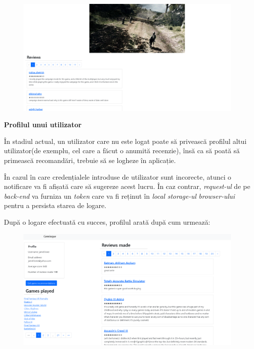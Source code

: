 \documentclass[12pt,a4paper]{report}
\begin{document}
\begin{figure}[H]
\centering
\caption{}
\begin{adjustbox}{max size={\textwidth}{\textheight}}
\includegraphics{exemplu_35_game_details_2}
\end{adjustbox}

\caption*{}
\end{figure}

\bigskip
\textbf{Profilul unui utilizator}
\bigskip

În stadiul actual, un utilizator care nu este logat poate să privească profilul altui utilizator(de exemplu, cel care a făcut o anumită recenzie), însă ca să poată să primească recomandări, trebuie să se logheze în aplicație.

În cazul în care credențialele introduse de utilizator sunt incorecte, atunci o notificare va fi afișată care să sugereze acest lucru. În caz contrar, \emph{request-ul} de pe \emph{back-end} va furniza un \emph{token} care va fi reținut în \emph{local storage-ul} \emph{browser-ului} pentru a persista starea de logare.
 
 După o logare efectuată cu succes, profilul arată după cum urmează:

\begin{figure}[H]
\centering
\caption{}
\begin{adjustbox}{max size={\textwidth}{\textheight}}
\includegraphics{exemplu_36_profile}
\end{adjustbox}

\caption*{}
\end{figure}
\end{document}
